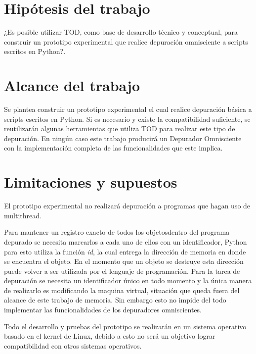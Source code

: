 \documentclass[12pt,legalpaper]{report}
\begin{document}
	\section{Hipótesis del trabajo}

    ¿Es posible utilizar TOD, como base de desarrollo técnico y conceptual, para construir un prototipo experimental que realice depuración omnisciente a scripts escritos en Python?.

	\section{Alcance del trabajo}

    Se plantea construir un prototipo experimental el cual realice depuración básica a scripts escritos en Python. Si es necesario y existe la compatibilidad suficiente, se reutilizarán algunas herramientas que utiliza TOD para realizar este tipo de depuración. En ningún caso este trabajo producirá un Depurador Omnisciente con la implementación completa de las funcionalidades que este implica.

	\section{Limitaciones y supuestos}

El prototipo experimental no realizará depuración a programas que hagan uso de multithread.

    Para mantener un registro exacto de todos los objetos\footnotemark[1] dentro del programa depurado se necesita marcarlos a cada uno de ellos con un identificador, Python para esto utiliza la función \textit{id}, la cual entrega la dirección de memoria en donde se encuentra el objeto.  En el momento que un objeto se destruye esta dirección puede volver a ser utilizada por el lenguaje de programación.  Para la tarea de depuración se necesita un identificador único en todo momento y la única manera de realizarlo es modificando la maquina virtual, situación que queda fuera del alcance de este trabajo de memoria. Sin embargo esto no impide del todo implementar las funcionalidades de los depuradores omniscientes.  

    Todo el desarrollo y pruebas del prototipo se realizarán en un sistema operativo basado en el kernel de Linux, debido a esto no será un objetivo lograr compatibilidad con otros sistemas operativos.

\end{document}
